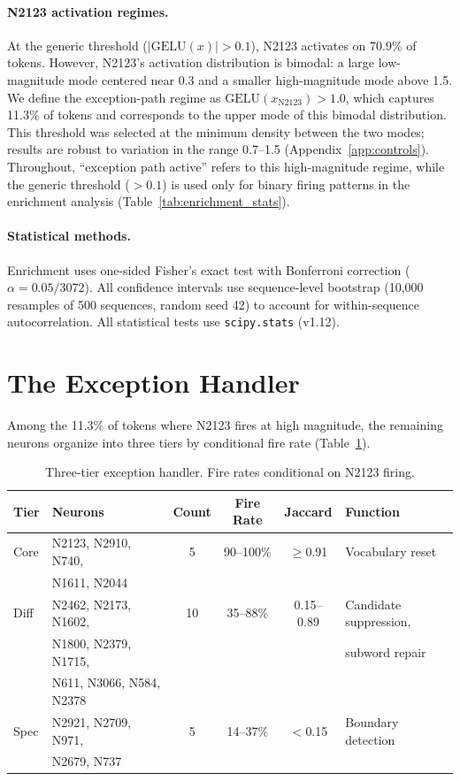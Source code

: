 \documentclass{article}
\begin{document}
\paragraph{N2123 activation regimes.}
At the generic threshold ($|\text{GELU}(x)| > 0.1$), N2123 activates on 70.9\% of tokens.
However, N2123's activation distribution is bimodal: a large low-magnitude
mode centered near 0.3 and a smaller high-magnitude mode above 1.5.
We define the exception-path regime as $\text{GELU}(x_{\text{N2123}}) > 1.0$,
which captures 11.3\% of tokens and corresponds to the upper mode of
this bimodal distribution.
This threshold was selected at the minimum density between the two modes;
results are robust to variation in the range 0.7--1.5 (Appendix~\ref{app:controls}).
Throughout, ``exception path active'' refers to this high-magnitude regime,
while the generic threshold ($> 0.1$) is used only for binary firing patterns
in the enrichment analysis (Table~\ref{tab:enrichment_stats}).

\paragraph{Statistical methods.}
Enrichment uses one-sided Fisher's exact test with Bonferroni correction
($\alpha = 0.05/3072$).
All confidence intervals use sequence-level bootstrap (10{,}000 resamples of
500 sequences, random seed 42) to account for within-sequence autocorrelation.
All statistical tests use \texttt{scipy.stats} (v1.12).

\section{The Exception Handler}
\label{sec:exception}

Among the 11.3\% of tokens where N2123 fires at high magnitude, the remaining
neurons organize into three tiers by conditional fire rate
(Table~\ref{tab:tiers}).

\begin{table}[t]
\centering
\caption{Three-tier exception handler. Fire rates conditional on N2123 firing.}
\label{tab:tiers}
\small
\begin{tabular}{@{}llcccl@{}}
\toprule
Tier & Neurons & Count & Fire Rate & Jaccard & Function \\
\midrule
Core & N2123, N2910, N740, & 5 & 90--100\% & $\geq$0.91 & Vocabulary reset \\
     & N1611, N2044 & & & & \\
Diff & N2462, N2173, N1602, & 10 & 35--88\% & 0.15--0.89 & Candidate suppression, \\
     & N1800, N2379, N1715, & & & & subword repair \\
     & N611, N3066, N584, N2378 & & & & \\
Spec & N2921, N2709, N971, & 5 & 14--37\% & $<$0.15 & Boundary detection \\
     & N2679, N737 & & & & \\
\bottomrule
\end{tabular}
\end{table}
\end{document}
